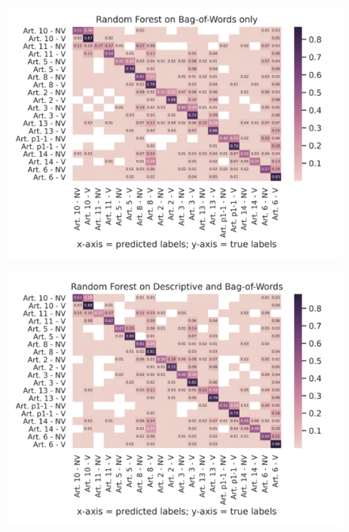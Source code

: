 \documentclass{article}
\begin{document}
\begin{figure}[!htb]
    \centering
    \includegraphics[scale=0.7]{data/analysis/cm/multiclass_cm_test_random_forest_bag-of-words_only.png}  
\end{figure}
\begin{figure}[!htb]
    \centering
    \includegraphics[scale=0.7]{data/analysis/cm/multiclass_cm_test_random_forest_descriptive_and_bag-of-words.png}  
\end{figure}
\end{document}
